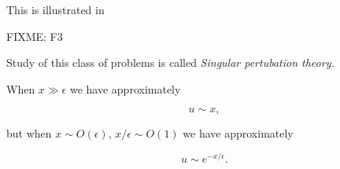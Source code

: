 This is illustrated in

FIXME: F3

Study of this class of problems is called \em{Singular pertubation theory}.

When $x \gg \epsilon$ we have approximately

\begin{equation}\label{eqn:continuumL19:n}
u \sim x,
\end{equation}

but when $x \sim O(\epsilon)$, $x/\epsilon \sim O(1)$ we have approximately

\begin{equation}\label{eqn:continuumL19:n}
u \sim e^{-x/\epsilon}.
\end{equation}

\EndNoBibArticle
